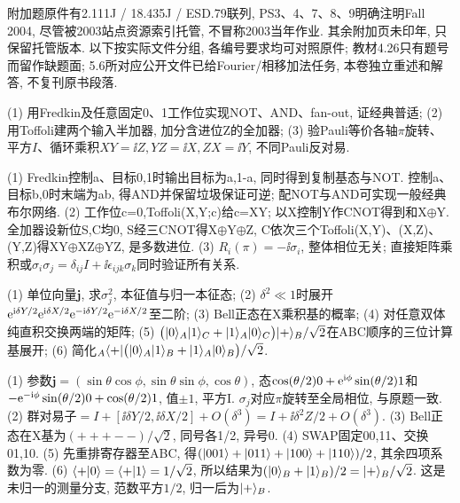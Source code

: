 附加题原件有2.111J / 18.435J / ESD.79联列, PS3、4、7、8、9明确注明Fall 2004, 尽管被2003站点资源索引托管, 不冒称2003当年作业. 其余附加页未印年, 只保留托管版本. 以下按实际文件分组, 各编号要求均可对照原件; 教材4.26只有题号而留作缺题面; 5.6所对应公开文件已给Fourier/相移加法任务, 本卷独立重述和解答, 不复刊原书段落.
\begin{exercise}(1) 用Fredkin及任意固定0、1工作位实现NOT、AND、fan-out, 证经典普适; (2) 用Toffoli建两个输入半加器, 加分含进位Z的全加器; (3) 验Pauli等价各轴$\pi$旋转、平方$I$、循环乘积$XY=\ii Z,YZ=\ii X,ZX=\ii Y$, 不同Pauli反对易.\end{exercise}
\begin{solution}(1) Fredkin控制a、目标0,1时输出目标为a,1-a, 同时得到复制基态与NOT. 控制a、目标b,0时末端为ab, 得AND并保留垃圾保证可逆; 配NOT与AND可实现一般经典布尔网络. (2) 工作位c=0,Toffoli(X,Y;c)给c=XY; 以X控制Y作CNOT得到和X$\oplus$Y. 全加器设新位S,C均0, S经三CNOT得X$\oplus$Y$\oplus$Z, C依次三个Toffoli(X,Y)、(X,Z)、(Y,Z)得XY$\oplus$XZ$\oplus$YZ, 是多数进位. (3) $R_i(\pi)=-\ii\sigma_i$, 整体相位无关; 直接矩阵乘积或$\sigma_i\sigma_j=\delta_{ij}I+\ii\epsilon_{ijk}\sigma_k$同时验证所有关系.
\end{solution}
\begin{exercise}(1) 单位向量$\mathbf j$, 求$\sigma_j^2$, 本征值与归一本征态; (2) $\delta^2\ll1$时展开$\mathrm e^{\mathrm i\delta Y/2}\mathrm e^{\mathrm i\delta X/2}\mathrm e^{-\mathrm i\delta Y/2}\mathrm e^{-\mathrm i\delta X/2}$至二阶; (3) Bell正态在X乘积基的概率; (4) 对任意双体纯直积交换两端的矩阵; (5) $\bigl(\lvert 0\rangle_A\lvert 1\rangle_C+\lvert 1\rangle_A\lvert 0\rangle_C\bigr)\lvert +\rangle_B/\sqrt2$在ABC顺序的三位计算基展开; (6) 简化${}_A\langle +\rvert\bigl(\lvert 0\rangle_A\lvert 1\rangle_B+\lvert 1\rangle_A\lvert 0\rangle_B\bigr)/\sqrt2$.\end{exercise}
\begin{solution}(1) 参数$\mathbf j=(\sin\theta\cos\phi,\sin\theta\sin\phi,\cos\theta)$, 态$\cos(\theta/2)0+\mathrm e^{\mathrm i\phi}\sin(\theta/2)1$和$-\mathrm e^{-\mathrm i\phi}\sin(\theta/2)0+\cos(\theta/2)1$, 值$\pm1$, 平方I. $\sigma_j$对应$\pi$旋转至全局相位, 与原题一致. (2) 群对易子$=I+[\ii\delta Y/2,\ii\delta X/2]+O(\delta^3)=I+\ii\delta^2Z/2+O(\delta^3)$. (3) Bell正态在X基为$(++ + --)/\sqrt2$, 同号各1/2, 异号0. (4) SWAP固定00,11、交换01,10. (5) 先重排寄存器至ABC, 得$(\lvert 001\rangle+\lvert 011\rangle+\lvert 100\rangle+\lvert 110\rangle)/2$, 其余四项系数为零. (6) $\langle +\rvert0\rangle=\langle +\rvert1\rangle=1/\sqrt2$, 所以结果为$(\lvert 0\rangle_B+\lvert 1\rangle_B)/2=\lvert +\rangle_B/\sqrt2$. 这是未归一的测量分支, 范数平方$1/2$, 归一后为$\lvert +\rangle_B$.
\end{solution}


